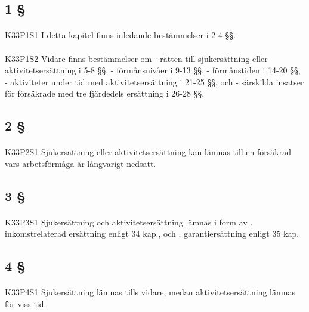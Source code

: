 \documentclass[a4paper,notitlepage,openany,10pt]{book}
\begin{document}
\subsection*{1 §}
\paragraph*{}
{\tiny K33P1S1}
I detta kapitel finns inledande bestämmelser i 2-4 §§.
\paragraph*{}
{\tiny K33P1S2}
Vidare finns bestämmelser om
\newline - rätten till sjukersättning eller aktivitetsersättning i 5-8 §§,
\newline - förmånsnivåer i 9-13 §§,
\newline - förmånstiden i 14-20 §§,
\newline - aktiviteter under tid med aktivitetsersättning i 21-25 §§, och
\newline - särskilda insatser för försäkrade med tre fjärdedels ersättning i 26-28 §§.
\subsection*{2 §}
\paragraph*{}
{\tiny K33P2S1}
Sjukersättning eller aktivitetsersättning kan lämnas till en försäkrad vars arbetsförmåga är långvarigt nedsatt.
\subsection*{3 §}
\paragraph*{}
{\tiny K33P3S1}
Sjukersättning och aktivitetsersättning lämnas i form av
. inkomstrelaterad ersättning enligt 34 kap., och
. garantiersättning enligt 35 kap.
\subsection*{4 §}
\paragraph*{}
{\tiny K33P4S1}
Sjukersättning lämnas tills vidare, medan aktivitetsersättning lämnas för viss tid.
\end{document}
